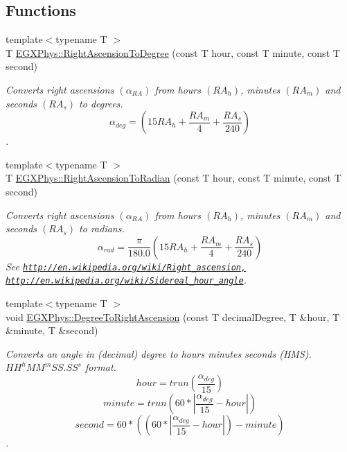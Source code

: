 \subsection*{Functions}
\begin{DoxyCompactItemize}
\item 
{\footnotesize template$<$typename T $>$ }\\T \mbox{\hyperlink{group___e_g_x_phys-_astrophysics-_right_ascension_ga27ba790eb8358535613d3b32f97d9e3a}{E\+G\+X\+Phys\+::\+Right\+Ascension\+To\+Degree}} (const T hour, const T minute, const T second)
\begin{DoxyCompactList}\small\item\em Converts right ascensions $(\alpha_{RA})$ from hours $(RA_h)$, minutes $(RA_m)$ and seconds $(RA_s)$ to degrees. \[\alpha_{deg}=(15 RA_h + \frac{RA_m}{4} + \frac{RA_s}{240})\]. \end{DoxyCompactList}\item 
{\footnotesize template$<$typename T $>$ }\\T \mbox{\hyperlink{group___e_g_x_phys-_astrophysics-_right_ascension_ga63a3103990c95078443e39a5b487ab0d}{E\+G\+X\+Phys\+::\+Right\+Ascension\+To\+Radian}} (const T hour, const T minute, const T second)
\begin{DoxyCompactList}\small\item\em Converts right ascensions $(\alpha_{RA})$ from hours $(RA_h)$, minutes $(RA_m)$ and seconds $(RA_s)$ to radians. \[\alpha_{rad}=\frac{\pi}{180.0}(15 RA_h + \frac{RA_m}{4} + \frac{RA_s}{240})\] See \href{http://en.wikipedia.org/wiki/Right_ascension,}{\tt http\+://en.\+wikipedia.\+org/wiki/\+Right\+\_\+ascension,} \href{http://en.wikipedia.org/wiki/Sidereal_hour_angle}{\tt http\+://en.\+wikipedia.\+org/wiki/\+Sidereal\+\_\+hour\+\_\+angle}. \end{DoxyCompactList}\item 
{\footnotesize template$<$typename T $>$ }\\void \mbox{\hyperlink{group___e_g_x_phys-_astrophysics-_right_ascension_ga6fdbd35a030d278f396496899a1c236f}{E\+G\+X\+Phys\+::\+Degree\+To\+Right\+Ascension}} (const T decimal\+Degree, T \&hour, T \&minute, T \&second)
\begin{DoxyCompactList}\small\item\em Converts an angle in (decimal) degree to hours minutes seconds (H\+MS). ${HH}^{h}{MM}^{m}{SS.SS}^{s}$ format. \[hour=trun(\frac{\alpha_{deg}}{15})\] \[minute=trun(60 * |\frac{\alpha_{deg}}{15} - hour|)\] \[second=60 * ((60 * |\frac{\alpha_{deg}}{15} - hour|)-minute)\]. \end{DoxyCompactList}\item 

\end{DoxyCompactItemize}
